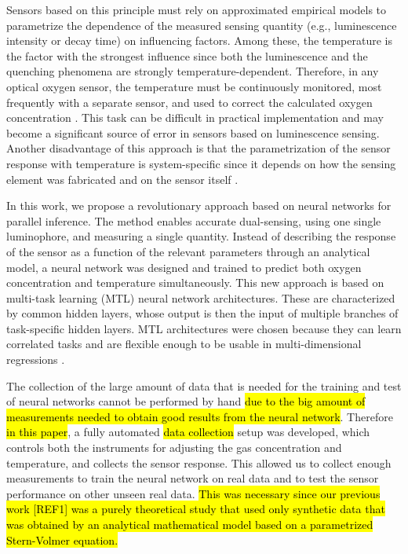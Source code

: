 \documentclass[final,5p,times,twocolumn]{elsarticle}
\begin{document}
Sensors based on this principle must rely on approximated empirical models to parametrize the dependence of the measured sensing quantity (e.g., luminescence intensity or decay time) on influencing factors. Among these, the temperature is the factor with the strongest influence since both the luminescence and the quenching phenomena are strongly temperature-dependent. Therefore, in any optical oxygen sensor, the temperature must be continuously monitored, most frequently with a separate sensor, and used to correct the calculated oxygen concentration \cite{Li2015}. This task can be difficult in practical implementation and may become a significant source of error in sensors based on luminescence sensing. Another disadvantage of this approach is that the parametrization of the sensor response with temperature is system-specific since it depends  on how the sensing element was fabricated and on the sensor itself \cite{Xu1994,Draxler1995,Hartmann1996,Mills1998,Badocco2008,Dini2011}.

In this work, we propose a revolutionary approach based on neural networks for parallel inference. The method enables accurate dual-sensing, using one single luminophore, and measuring a single quantity.
Instead of describing the response of the sensor as a function of the relevant parameters through an analytical model, a neural network  was designed and trained to predict both oxygen concentration and temperature simultaneously.
This new approach is based on multi-task learning (MTL) neural network architectures. These are characterized by common hidden layers, whose output is then the input of multiple branches of task-specific hidden layers. MTL architectures were chosen because they can learn correlated tasks \cite{Argyriou2006, Thrun1996, Caruana1997, Zhang2017, Baxter2000, Thung2018} and are flexible enough to be usable in multi-dimensional regressions \cite{Michelucci2019_2}.


The collection of the large amount of data that is needed for the training and test of neural networks cannot be performed by hand \hl{due to the big amount of measurements needed to obtain good results from the neural network}. Therefore \hl{in this paper}, a fully automated \hl{data collection} setup was developed, which controls both the instruments for adjusting the gas concentration and temperature, and collects the sensor response. This allowed us to collect enough measurements to train the neural network on real data and to test the sensor performance on other unseen real data. \hl{This was necessary since our previous work [REF1] was a purely theoretical study that used only synthetic data that was obtained by an analytical mathematical model based on a parametrized Stern-Volmer equation.}
\end{document}
